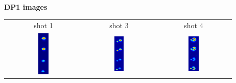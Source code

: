 \documentclass[landscape]{slides}
\begin{document}
\begin{slide}
{\large \textbf{DP1 images}}

\begin{center}
\begin{tabular}{ccc}
shot 1 & shot 3 & shot 4 \hspace{2.0cm}\\
\includegraphics[width=0.14\textwidth]{dp1_1.png} &
\includegraphics[width=0.14\textwidth]{dp1_2.png} &
\includegraphics[width=0.14\textwidth]{dp1_3.png} \\
\end{tabular}
\end{center}


\end{slide}
\end{document}
